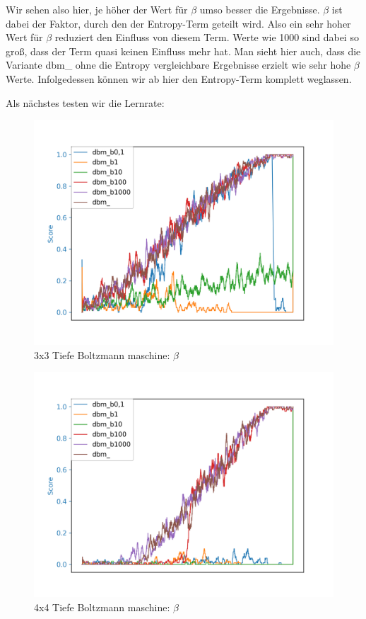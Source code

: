 Wir sehen also hier, je höher der Wert für $\beta$ umso besser die Ergebnisse. $\beta$ ist dabei der Faktor, durch den der Entropy-Term geteilt wird. Also ein sehr hoher Wert für $\beta$ reduziert den Einfluss von diesem Term. Werte wie 1000 sind dabei so groß, dass der Term quasi keinen Einfluss mehr hat. Man sieht hier auch, dass die Variante dbm\_ ohne die Entropy vergleichbare Ergebnisse erzielt wie sehr hohe $\beta$ Werte. Infolgedessen können wir ab hier den Entropy-Term komplett weglassen.

Als nächstes testen wir die Lernrate:

\begin{figure}[H]
\centering
\includegraphics[width=\textwidth]{Figures/dbm2_3x3_dbm_b0,1_dbm_b1_dbm_b10_dbm_b100_dbm_b1000_dbm_.png}
\caption{3x3 Tiefe Boltzmann maschine: $\beta$}
\label{dbm1}
\end{figure}

\begin{figure}[H]
\centering
\includegraphics[width=\textwidth]{Figures/dbm3_4x4_dbm_b0,1_dbm_b1_dbm_b10_dbm_b100_dbm_b1000_dbm_.png}
\caption{4x4 Tiefe Boltzmann maschine: $\beta$}
\label{dbm1}
\end{figure}

